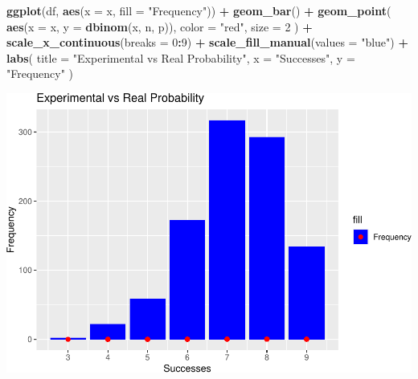 \documentclass[
]{article}
\newenvironment{Shaded}{\begin{snugshade}}{\end{snugshade}}
\newcommand{\DataTypeTok}[1]{\textcolor[rgb]{0.13,0.29,0.53}{#1}}
\newcommand{\DecValTok}[1]{\textcolor[rgb]{0.00,0.00,0.81}{#1}}
\newcommand{\KeywordTok}[1]{\textcolor[rgb]{0.13,0.29,0.53}{\textbf{#1}}}
\newcommand{\NormalTok}[1]{#1}
\newcommand{\OperatorTok}[1]{\textcolor[rgb]{0.81,0.36,0.00}{\textbf{#1}}}
\newcommand{\StringTok}[1]{\textcolor[rgb]{0.31,0.60,0.02}{#1}}
\begin{document}
\begin{Shaded}
\begin{Highlighting}[]
\KeywordTok{ggplot}\NormalTok{(df, }\KeywordTok{aes}\NormalTok{(}\DataTypeTok{x =}\NormalTok{ x, }\DataTypeTok{fill =} \StringTok{"Frequency"}\NormalTok{)) }\OperatorTok{+}
\StringTok{  }\KeywordTok{geom\_bar}\NormalTok{() }\OperatorTok{+}
\StringTok{  }\KeywordTok{geom\_point}\NormalTok{(}
    \KeywordTok{aes}\NormalTok{(}\DataTypeTok{x =}\NormalTok{ x, }\DataTypeTok{y =} \KeywordTok{dbinom}\NormalTok{(x, n, p)),}
    \DataTypeTok{color =} \StringTok{"red"}\NormalTok{,}
    \DataTypeTok{size =} \DecValTok{2}
\NormalTok{  ) }\OperatorTok{+}
\StringTok{  }\KeywordTok{scale\_x\_continuous}\NormalTok{(}\DataTypeTok{breaks =} \DecValTok{0}\OperatorTok{:}\DecValTok{9}\NormalTok{) }\OperatorTok{+}
\StringTok{  }\KeywordTok{scale\_fill\_manual}\NormalTok{(}\DataTypeTok{values =} \StringTok{"blue"}\NormalTok{) }\OperatorTok{+}
\StringTok{  }\KeywordTok{labs}\NormalTok{(}
    \DataTypeTok{title =} \StringTok{"Experimental vs Real Probability"}\NormalTok{,}
    \DataTypeTok{x =} \StringTok{"Successes"}\NormalTok{,}
    \DataTypeTok{y =} \StringTok{"Frequency"}
\NormalTok{  )}
\end{Highlighting}
\end{Shaded}

\includegraphics{es_files/figure-latex/unnamed-chunk-15-1.pdf}
\end{document}
